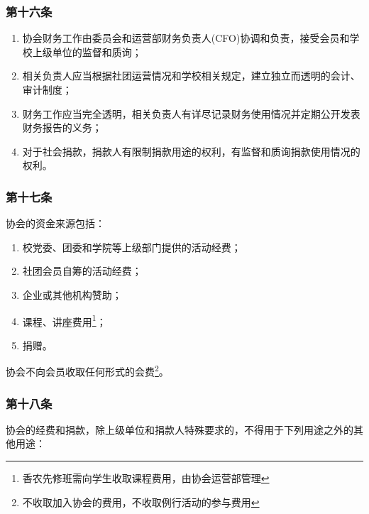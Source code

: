 \documentclass[
]{ctexart}
\begin{document}
\hypertarget{ux7b2cux5341ux516dux6761-ux8d22ux52a1ux653fux7b56}{%
\subsubsection{第十六条}\label{ux7b2cux5341ux516dux6761-ux8d22ux52a1ux653fux7b56}}

\begin{enumerate}
\def\labelenumi{\arabic{enumi}.}
\item
  协会财务工作由委员会和运营部财务负责人(CFO)协调和负责，接受会员和学校上级单位的监督和质询；
\item
  相关负责人应当根据社团运营情况和学校相关规定，建立独立而透明的会计、审计制度；
\item
  财务工作应当完全透明，相关负责人有详尽记录财务使用情况并定期公开发表财务报告的义务；
\item
  对于社会捐款，捐款人有限制捐款用途的权利，有监督和质询捐款使用情况的权利。
\end{enumerate}

\hypertarget{ux7b2cux5341ux4e03ux6761-ux7ecfux8d39ux6765ux6e90}{%
\subsubsection{第十七条}\label{ux7b2cux5341ux4e03ux6761-ux7ecfux8d39ux6765ux6e90}}

协会的资金来源包括：

\begin{enumerate}
\def\labelenumi{\arabic{enumi}.}
\item
  校党委、团委和学院等上级部门提供的活动经费；
\item
  社团会员自筹的活动经费；
\item
  企业或其他机构赞助；
\item
  课程、讲座费用\footnote{香农先修班需向学生收取课程费用，由协会运营部管理}；
\item
  捐赠。
\end{enumerate}

协会不向会员收取任何形式的会费\footnote{不收取加入协会的费用，不收取例行活动的参与费用}。

\hypertarget{ux7b2cux5341ux516bux6761-ux7ecfux8d39ux8fd0ux7528}{%
\subsubsection{第十八条}\label{ux7b2cux5341ux516bux6761-ux7ecfux8d39ux8fd0ux7528}}

协会的经费和捐款，除上级单位和捐款人特殊要求的，不得用于下列用途之外的其他用途：
\end{document}
